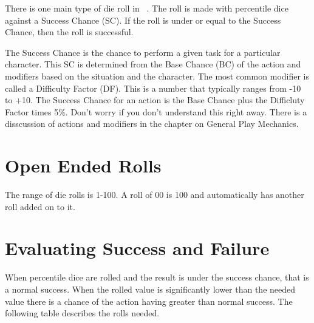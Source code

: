 There is one main type of die roll in \SH\ . The roll is 
made with percentile dice against a Success Chance (SC). If the roll 
is under or equal to the Success Chance, then the roll is successful.

The Success Chance is the chance to perform a given task for a particular
character. This SC is determined from the Base Chance (BC) of the action 
and modifiers based on the situation and the character. The most common 
modifier is called a Difficulty Factor (DF). This is a number that typically 
ranges from -10 to +10. The Success Chance for an action is the Base Chance plus 
the Difficluty Factor times 5\%. Don't worry if you don't understand this right away.
There is a disscussion of actions and modifiers in the chapter on General Play 
Mechanics.

\section{Open Ended Rolls}

The range of die rolls is 1-100. A roll of 00 is 100 and 
automatically has another roll added on to it.

\section{Evaluating Success and Failure}

When percentile dice are rolled and the result is under the success chance, that
is a normal success. When the rolled value is significantly lower than the needed 
value there is a chance of the action having greater than normal success. The following 
table describes the rolls needed.



\newpage


